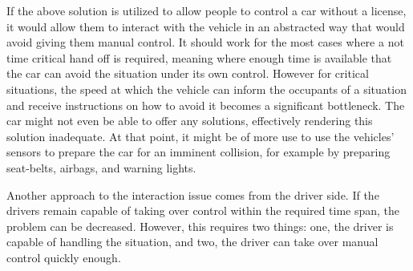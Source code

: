 \documentclass{acm_proc_article-sp}
\begin{document}
If the above solution is utilized to allow people to control a car without a license, it would allow them to interact with the vehicle in an abstracted way that would avoid giving them manual control.
It should work for the most cases where a not time critical hand off is required, meaning where enough time is available that the car can avoid the situation under its own control.
However for critical situations, the speed at which the vehicle can inform the occupants of a situation and receive instructions on how to avoid it becomes a significant bottleneck.
The car might not even be able to offer any solutions, effectively rendering this solution inadequate.
At that point, it might be of more use to use the vehicles' sensors to prepare the car for an imminent collision, for example by preparing seat-belts, airbags, and warning lights.

Another approach to the interaction issue comes from the driver side.
If the drivers remain capable of taking over control within the required time span, the problem can be decreased.
However, this requires two things: one, the driver is capable of handling the situation, and two, the driver can take over manual control quickly enough.
\end{document}
